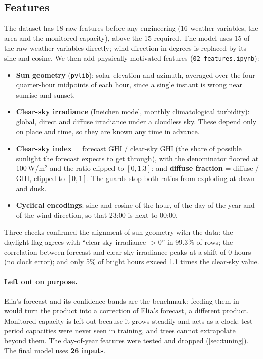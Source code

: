 \documentclass[11pt,a4paper]{article}
\begin{document}
\subsection{Features}

The dataset has 18 raw features before any engineering (16 weather variables, the area and the
monitored capacity), above the 15 required. The model uses 15 of the raw weather variables
directly; wind direction in degrees is replaced by its sine and cosine. We then add physically
motivated features (\texttt{02\_features.ipynb}):

\begin{itemize}
  \item \textbf{Sun geometry} (\texttt{pvlib}): solar elevation and azimuth, averaged over the four
  quarter-hour midpoints of each hour, since a single instant is wrong near sunrise and sunset.
  \item \textbf{Clear-sky irradiance} (Ineichen model, monthly climatological turbidity): global,
  direct and diffuse irradiance under a cloudless sky. These depend only on place and time, so they
  are known any time in advance.
  \item \textbf{Clear-sky index} = forecast GHI / clear-sky GHI (the share of possible sunlight the
  forecast expects to get through), with the denominator floored at 100\,W/m$^2$ and the ratio
  clipped to $[0, 1.3]$; and \textbf{diffuse fraction} = diffuse / GHI, clipped to $[0,1]$. The
  guards stop both ratios from exploding at dawn and dusk.
  \item \textbf{Cyclical encodings}: sine and cosine of the hour, of the day of the year and of the
  wind direction, so that 23:00 is next to 00:00.
\end{itemize}

Three checks confirmed the alignment of sun geometry with the data: the daylight flag agrees with
``clear-sky irradiance $>0$'' in 99.3\% of rows; the correlation between forecast and clear-sky
irradiance peaks at a shift of 0 hours (no clock error); and only 5\% of bright hours exceed 1.1
times the clear-sky value.

\paragraph{Left out on purpose.} Elia's forecast and its confidence bands are the benchmark: feeding
them in would turn the product into a correction of Elia's forecast, a different product.
Monitored capacity is left out because it grows steadily and acts as a clock: test-period
capacities were never seen in training, and trees cannot extrapolate beyond them. The day-of-year
features were tested and dropped (\cref{sec:tuning}). The final model uses \textbf{26 inputs}.
\end{document}
